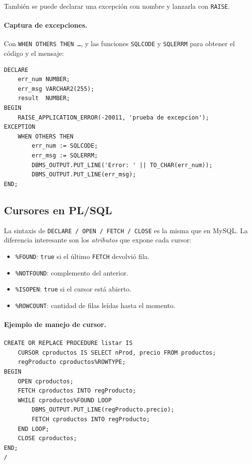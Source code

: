 \documentclass[11pt,a4paper]{article}
\begin{document}
También se puede declarar una excepción con nombre y lanzarla con
\texttt{RAISE}.

\paragraph{Captura de excepciones.} Con \texttt{WHEN OTHERS THEN \dots},
y las funciones \texttt{SQLCODE} y \texttt{SQLERRM} para obtener el
código y el mensaje:

\begin{lstlisting}
DECLARE
    err_num NUMBER;
    err_msg VARCHAR2(255);
    result  NUMBER;
BEGIN
    RAISE_APPLICATION_ERROR(-20011, 'prueba de excepcion');
EXCEPTION
    WHEN OTHERS THEN
        err_num := SQLCODE;
        err_msg := SQLERRM;
        DBMS_OUTPUT.PUT_LINE('Error: ' || TO_CHAR(err_num));
        DBMS_OUTPUT.PUT_LINE(err_msg);
END;
\end{lstlisting}

\subsection{Cursores en PL/SQL}

La sintaxis de \texttt{DECLARE / OPEN / FETCH / CLOSE} es la misma
que en MySQL. La diferencia interesante son los \emph{atributos} que
expone cada cursor:

\begin{itemize}
    \item \texttt{\%FOUND}: \texttt{true} si el último \texttt{FETCH}
    devolvió fila.
    \item \texttt{\%NOTFOUND}: complemento del anterior.
    \item \texttt{\%ISOPEN}: \texttt{true} si el cursor está abierto.
    \item \texttt{\%ROWCOUNT}: cantidad de filas leídas hasta el
    momento.
\end{itemize}

\paragraph{Ejemplo de manejo de cursor.}

\begin{lstlisting}
CREATE OR REPLACE PROCEDURE listar IS
    CURSOR cproductos IS SELECT nProd, precio FROM productos;
    regProducto cproductos%ROWTYPE;
BEGIN
    OPEN cproductos;
    FETCH cproductos INTO regProducto;
    WHILE cproductos%FOUND LOOP
        DBMS_OUTPUT.PUT_LINE(regProducto.precio);
        FETCH cproductos INTO regProducto;
    END LOOP;
    CLOSE cproductos;
END;
/
\end{lstlisting}
\end{document}
